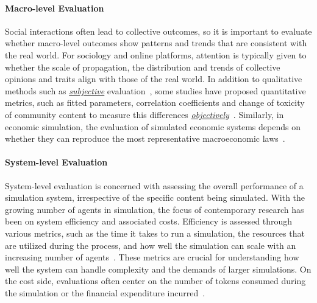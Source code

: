 \paragraph{Macro-level Evaluation}
Social interactions often lead to collective outcomes, so it is important to evaluate whether macro-level outcomes show patterns and trends that are consistent with the real world. For sociology and online platforms, attention is typically given to whether the scale of propagation, the distribution and trends of collective opinions and traits align with those of the real world. In addition to qualitative methods such as \textit{\underline{subjective}} evaluation~\cite{gao2023s3,Zhang2024on}, some studies have proposed quantitative metrics, such as fitted parameters, correlation coefficients and change of toxicity of community content to measure this differences \textit{\underline{objectively}}~\cite {tornberg2023simulating,liu2024skepticism,mou2024unveiling,yang2024oasis}. Similarly, in economic simulation, the evaluation of simulated economic systems depends on whether they can reproduce the most representative macroeconomic laws~\cite{li2024econagent}.

\paragraph{System-level Evaluation}
System-level evaluation is concerned with assessing the overall performance of a simulation system, irrespective of the specific content being simulated. With the growing number of agents in simulation, the focus of contemporary research has been on system efficiency and associated costs. Efficiency is assessed through various metrics, such as the time it takes to run a simulation, the resources that are utilized during the process, and how well the simulation can scale with an increasing number of agents~\cite{wang2023recagent,yang2024oasis,pan2024very}. These metrics are crucial for understanding how well the system can handle complexity and the demands of larger simulations. On the cost side, evaluations often center on the number of tokens consumed during the simulation or the financial expenditure incurred~\cite{yu2024affordable}. 
